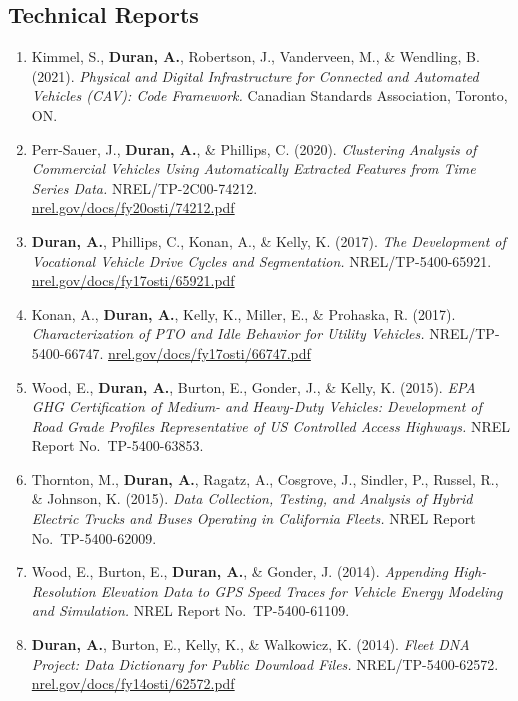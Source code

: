 \documentclass[11pt,letterpaper]{article}
\begin{document}
\subsection{Technical Reports}

\begin{enumerate}
  \item Kimmel, S., \textbf{Duran, A.}, Robertson, J., Vanderveen, M., \& Wendling, B.
        (2021). \textit{Physical and Digital Infrastructure for Connected and Automated
        Vehicles (CAV): Code Framework.} Canadian Standards Association, Toronto, ON.

  \item Perr-Sauer, J., \textbf{Duran, A.}, \& Phillips, C. (2020).
        \textit{Clustering Analysis of Commercial Vehicles Using Automatically Extracted
        Features from Time Series Data.} NREL/TP-2C00-74212.\\
        \href{https://www.nrel.gov/docs/fy20osti/74212.pdf}{nrel.gov/docs/fy20osti/74212.pdf}

  \item \textbf{Duran, A.}, Phillips, C., Konan, A., \& Kelly, K. (2017).
        \textit{The Development of Vocational Vehicle Drive Cycles and Segmentation.}
        NREL/TP-5400-65921.
        \href{https://www.nrel.gov/docs/fy17osti/65921.pdf}{nrel.gov/docs/fy17osti/65921.pdf}

  \item Konan, A., \textbf{Duran, A.}, Kelly, K., Miller, E., \& Prohaska, R. (2017).
        \textit{Characterization of PTO and Idle Behavior for Utility Vehicles.}
        NREL/TP-5400-66747.
        \href{https://www.nrel.gov/docs/fy17osti/66747.pdf}{nrel.gov/docs/fy17osti/66747.pdf}

  \item Wood, E., \textbf{Duran, A.}, Burton, E., Gonder, J., \& Kelly, K. (2015).
        \textit{EPA GHG Certification of Medium- and Heavy-Duty Vehicles: Development of
        Road Grade Profiles Representative of US Controlled Access Highways.}
        NREL Report No.\ TP-5400-63853.

  \item Thornton, M., \textbf{Duran, A.}, Ragatz, A., Cosgrove, J., Sindler, P.,
        Russel, R., \& Johnson, K. (2015).
        \textit{Data Collection, Testing, and Analysis of Hybrid Electric Trucks and Buses
        Operating in California Fleets.} NREL Report No.\ TP-5400-62009.

  \item Wood, E., Burton, E., \textbf{Duran, A.}, \& Gonder, J. (2014).
        \textit{Appending High-Resolution Elevation Data to GPS Speed Traces for Vehicle
        Energy Modeling and Simulation.} NREL Report No.\ TP-5400-61109.

  \item \textbf{Duran, A.}, Burton, E., Kelly, K., \& Walkowicz, K. (2014).
        \textit{Fleet DNA Project: Data Dictionary for Public Download Files.}
        NREL/TP-5400-62572.
        \href{https://www.nrel.gov/docs/fy14osti/62572.pdf}{nrel.gov/docs/fy14osti/62572.pdf}
\end{enumerate}
\end{document}
